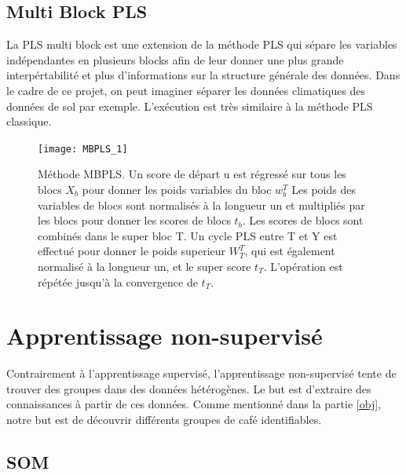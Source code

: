 \subsection{Multi Block PLS} 



La PLS multi block est une extension de la méthode PLS qui sépare les variables indépendantes en plusieurs blocks afin de leur donner une plus grande interpértabilité et plus d'informations sur la structure générale des données. Dans le cadre de ce projet, on peut imaginer séparer les données climatiques des données de sol par exemple.   
L'exécution est très similaire à la méthode PLS classique.  

\begin{figure}[H] 
	\centering
	\texttt{[image: MBPLS\_1]} 
	\caption{\label{MBPLSschema} Méthode MBPLS. Un score de départ u est régressé sur tous les blocs $ X_b $ pour donner les poids variables du bloc $ w^T_b $ Les poids des variables de blocs sont normalisés à la longueur un et multipliés par les blocs pour donner les scores de blocs $ t_b $.  Les scores de blocs sont combinés dans le super bloc T. Un cycle PLS entre T et Y est effectué pour donner le poids superieur $ W^T_T $, qui est également normalisé à la longueur un, et le super score $ t_T $. L'opération est répétée jusqu'à la convergence de $ t_T $. \cite{CEM:CEM515}} 
\end{figure} 






\newpage

\section{Apprentissage non-supervisé}
Contrairement à l'apprentissage supervisé, l'apprentissage non-supervisé tente de trouver des groupes dans des données hétérogènes. Le but est d'extraire des connaissances à partir de ces données. Comme mentionné dans la partie \ref{obj}, notre but est de découvrir différents groupes de café identifiables. 


\subsection{SOM}

